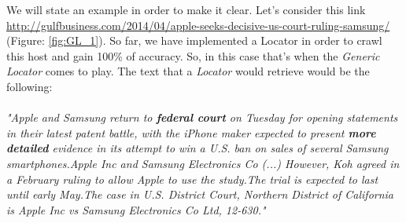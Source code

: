 We will state an example in order to make it clear. Let's consider this link \url{http://gulfbusiness.com/2014/04/apple-seeks-decisive-us-court-ruling-samsung/} (Figure: \ref{fig:GL_1}). So far, we have implemented a Locator in order to crawl this host and gain 100\% of accuracy. So, in this case that's when the \emph{Generic Locator} comes to play. The text that a \emph{Locator} would retrieve would be the following: 
\\\\
\emph{"Apple and Samsung return to \textbf{federal court} on Tuesday for opening statements in their latest patent battle, with the iPhone maker expected to present \textbf{more detailed} evidence in its attempt to win a U.S. ban on sales of several Samsung smartphones.Apple Inc and Samsung Electronics Co (...)
However, Koh agreed in a February ruling to allow Apple to use the study.The trial is expected to last until early May.The case in U.S. District Court, Northern District of California is Apple Inc vs Samsung Electronics Co Ltd, 12-630."}
